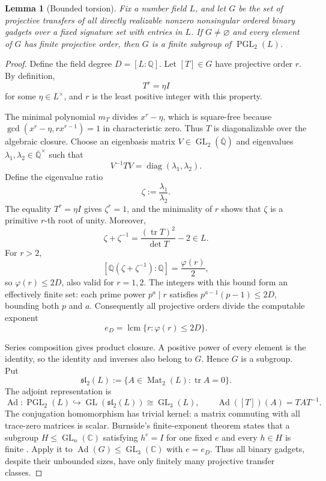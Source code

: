\documentclass[11pt,letterpaper,onecolumn]{article}
\theoremstyle{plain}
\newtheorem{lemma}[lemma]{Lemma}
\theoremstyle{definition}
\theoremstyle{remark}
\newcommand{\AlgNums}{\overline{\mathbb Q}}
\newcommand{\PGL}{\operatorname{PGL}}
\newcommand{\GL}{\operatorname{GL}}
\newcommand{\Mat}{\operatorname{Mat}}
\newcommand{\diag}{\operatorname{diag}}
\begin{document}
\begin{lemma}[Bounded torsion]
\label{lem:bounded-torsion}
Fix a number field \(L\), and let \(G\) be the set of projective
transfers of all directly realizable nonzero nonsingular ordered
binary gadgets over a fixed signature set with entries in \(L\).
If \(G\ne\varnothing\) and every element of \(G\) has finite
projective order, then \(G\) is a finite subgroup of
\(\PGL_2(L)\).
\end{lemma}

\begin{proof}
Define the field degree \(D=[L:\mathbb Q]\).  Let \([T]\in G\) have
projective order
\(r\).  By definition,
\[
  T^r=\eta I
\]
for some \(\eta\in L^\times\), and \(r\) is the least positive
integer with this property.

The minimal polynomial \(m_T\) divides \(x^r-\eta\), which is square-free
because \(\gcd(x^r-\eta,rx^{r-1})=1\) in characteristic zero.
Thus \(T\) is diagonalizable over the algebraic closure.  Choose
an eigenbasis matrix \(V\in\GL_2(\AlgNums)\) and eigenvalues
\(\lambda_1,\lambda_2\in\AlgNums^\times\) such that
\[
  V^{-1}TV=\diag(\lambda_1,\lambda_2).
\]
Define the eigenvalue ratio
\[
  \zeta:=\frac{\lambda_1}{\lambda_2}.
\]
The equality \(T^r=\eta I\) gives \(\zeta^r=1\), and the minimality of
\(r\) shows that \(\zeta\) is a primitive \(r\)-th root of unity.
Moreover,
\[
  \zeta+\zeta^{-1}
  =
  \frac{(\operatorname{tr}T)^2}{\det T}-2
  \in L.
\]
For \(r>2\),
\[
  [\mathbb Q(\zeta+\zeta^{-1}):\mathbb Q]
  =\frac{\varphi(r)}2,
\]
so \(\varphi(r)\le2D\), also valid for \(r=1,2\).  The integers with this
bound form an effectively finite set: each prime power \(p^a\mid r\)
satisfies \(p^{a-1}(p-1)\le2D\), bounding both \(p\) and \(a\).
Consequently all projective orders divide the computable exponent
\[
  e_D=\operatorname{lcm}\{r:\varphi(r)\le2D\}.
\]

Series composition gives product closure.  A positive power of every
element is the identity, so the identity and inverses also belong to
\(G\).  Hence \(G\) is a subgroup.  Put
\[
 \mathfrak{sl}_2(L)
 :=\{A\in\Mat_2(L):\operatorname{tr}A=0\}.
\]
The adjoint representation is
\[
  \operatorname{Ad}:\PGL_2(L)\hookrightarrow
  \GL(\mathfrak{sl}_2(L))\cong\GL_3(L),
  \qquad
  \operatorname{Ad}([T])(A)=TAT^{-1}.
\]
The conjugation homomorphism has trivial kernel: a matrix commuting with all trace-zero matrices
is scalar.  Burnside's finite-exponent theorem states that a subgroup
\(H\le\GL_n(\mathbb C)\) satisfying \(h^e=I\) for one fixed \(e\) and
every \(h\in H\) is finite \cite{Burnside1905}.  Apply it to
\(\operatorname{Ad}(G)\le\GL_3(\mathbb C)\) with \(e=e_D\).
Thus all binary gadgets, despite their unbounded sizes, have only finitely
many projective transfer classes.
\end{proof}
\end{document}
